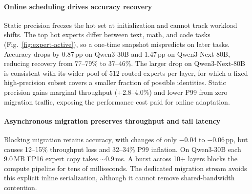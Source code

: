 \begin{table}[t]
\small
\centering
\caption{Component ablation (bs\,=\,32).}
\label{tab:ablation}
\vspace{-0.5em}
\setlength{\tabcolsep}{3pt}
\end{table}

\paragraph{Online scheduling drives accuracy recovery}
Static precision freezes the hot set at initialization and cannot track workload shifts. The top hot experts differ between text, math, and code tasks (Fig.~\ref{fig:expert-active}), so a one-time snapshot mispredicts on later tasks. Accuracy drops by 0.87\,pp on Qwen3-30B and 1.47\,pp on Qwen3-Next-80B, reducing recovery from 77--79\% to 37--46\%. The larger drop on Qwen3-Next-80B is consistent with its wider pool of 512 routed experts per layer, for which a fixed high-precision subset covers a smaller fraction of possible identities. Static precision gains marginal throughput (+2.8--4.0\%) and lower P99 from zero migration traffic, exposing the performance cost paid for online adaptation.

\paragraph{Asynchronous migration preserves throughput and tail latency}
Blocking migration retains accuracy, with changes of only $-$0.04 to $-$0.06\,pp, but causes 12--15\% throughput loss and 32--34\% P99 inflation. On Qwen3-30B each 9.0\,MB FP16 expert copy takes ${\sim}$0.9\,ms. A burst across 10+ layers blocks the compute pipeline for tens of milliseconds. The dedicated migration stream avoids this explicit inline serialization, although it cannot remove shared-bandwidth contention.

